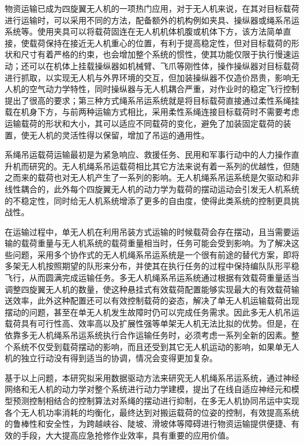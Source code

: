 \documentclass[lang=chs, degree=master, blindreview=false, winfonts=true]{yanputhesis}
\begin{document}
物资运输已成为四旋翼无人机的一项热门应用\cite{cruz2014autonomous}，对于无人机来说，在其对目标载荷进行运输时，可以采用不同的方法，配备额外的机构例如夹具、操纵器或绳系吊运系统等。使用夹具可以将载荷固连在无人机机体机腹或机体下方，该方法简单直接，使载荷保持在接近无人机重心的位置，有利于提高稳定性，但对目标载荷的形状和尺寸有着严格的约束，也会增加整个系统的惯性，使其功能仅限于执行慢速运动\cite{Khalifa2017}；还可以在机体上挂载操纵器如机械臂、飞爪等刚性体，操作操纵器对目标载荷进行抓取，以实现无人机与外界环境的交互，但加装操纵器不仅造价昂贵，影响无人机的空气动力学特性，同时操纵器与无人机耦合严重，对作业时的稳定飞行控制提出了很高的要求；第三种方式绳系吊运系统就是将目标载荷直接通过柔性系绳挂载在机身下方，与前两种运输方式相比，采用柔性系绳连接目标载荷时不需要考虑运输载荷的形状和大小，其可以适应不同载荷的变化，避免了加装固定载荷的装置，使无人机的灵活性得以保留，增加了吊运的通用性。

系绳吊运载荷运输最初是为紧急响应、救援任务、民用和军事行动中的人力操作直升机而研究的\cite{2020A}。无人机绳系吊运载荷相比其它方法来说有着一系列的优越性，但随之而来的载荷也对无人机产生了一系列的影响。无人机绳系吊运系统是欠驱动和非线性耦合的，此外每个四旋翼无人机的动力学为载荷的摆动运动会引发无人机系统的不稳定性，同时给无人机系统增添了更多的自由度，使得此类系统的控制更具挑战性。

在运输过程中，单无人机在利用吊装方式运输的时候载荷会存在摆动，且当需要运输的载荷重量与无人机系统的载荷重量相当时，任务可能会受到影响。为了解决这些问题，采用多个协作式的无人机绳系吊运系统是一个很有前途的替代方案，即将多架无人机按照期望的队形来分布，并使其在执行任务的过程中保持编队队形平稳飞行，从而圆满完成运输任务。多无人机绳系吊运系统通过根据有效载荷重量适当调整四旋翼无人机的数量，使这种悬挂式有效载荷配置能够实现最大的有效载荷输送效率，此外这种配置还可以有效控制载荷的姿态，解决了单无人机运输载荷出现摆动的问题，甚至在单无人机发生故障时仍可以完成任务需求。因此多无人机吊运载荷具有可行性高、效率高以及扩展性强等单架无人机无法比拟的优势。但是，在依靠多无人机绳系吊运系统执行合作运输任务时，必须考虑一系列全新的因素。整个系统不仅受到载荷摆动的影响，而且还受到其它无人机运动的影响，如果单无人机的独立行动没有得到适当的协调，情况会变得更加复杂。

基于以上问题，本研究拟采用数据驱动方法来研究无人机绳系吊运系统，通过神经网络和无人机的动力学对整个系统进行动力学建模，提出了在线自适应神经元和模型预测控制相结合的控制算法对系绳的摆动进行抑制，在多无人机协同吊运中实现各个无人机功率消耗的均衡化，最终达到对搬运载荷的位姿的控制，有效提高系统的鲁棒性和安全性，为跨越峡谷、陡坡、滑坡体等障碍进行物资运输提供便捷、有效的手段，大大提高应急抢修作业效率，具有重要的应用价值。
\end{document}
